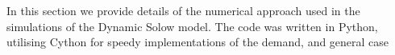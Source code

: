 In this section we provide details of the numerical approach used in the simulations of the Dynamic Solow model. The code was written in Python, utilising Cython for speedy implementations of the demand, and general case
